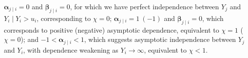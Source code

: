 \documentclass[
  12pt]{article}
\begin{document}
$\symbf{\alpha}_{j\mid i}=0$ and $\symbf{\beta}_{j\mid i}=0$, for which we have perfect
independence between $Y_j$ and $Y_i\mid Y_i>u_i$, corresponding to $\chi=0$;
$\symbf{\alpha}_{j\mid i}=1\ ( -1)$ and $\symbf{\beta}_{j\mid i}=0$, which corresponds to
positive (negative) asymptotic dependence, equivalent to $\chi=1$ ($\chi=0$); and
$-1<\symbf{\alpha}_{j\mid i}<1$, which suggests asymptotic independence between $Y_j$
and $Y_i$, with dependence weakening as $Y_i\to\infty$, equivalent to $\chi<1$.
\end{document}
